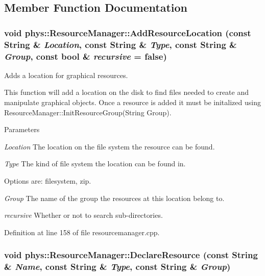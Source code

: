 \subsection{Member Function Documentation}
\hypertarget{classphys_1_1ResourceManager_a0d7d3adce2ad4c70a3e867396e17b090}{
\subsubsection[{AddResourceLocation}]{\setlength{\rightskip}{0pt plus 5cm}void phys::ResourceManager::AddResourceLocation (const {\bf String} \& {\em Location}, \/  const {\bf String} \& {\em Type}, \/  const {\bf String} \& {\em Group}, \/  const bool \& {\em recursive} = {\ttfamily false})}}
\label{d1/d35/classphys_1_1ResourceManager_a0d7d3adce2ad4c70a3e867396e17b090}


Adds a location for graphical resources. 

This function will add a location on the disk to find files needed to create and manipulate graphical objects. Once a resource is added it must be initalized using ResourceManager::InitResourceGroup(String Group). 
\begin{DoxyParams}{Parameters}
\item[{\em Location}]The location on the file system the resource can be found. \item[{\em Type}]The kind of file system the location can be found in. \par
 Options are: filesystem, zip. \item[{\em Group}]The name of the group the resources at this location belong to. \item[{\em recursive}]Whether or not to search sub-\/directories. \end{DoxyParams}


Definition at line 158 of file resourcemanager.cpp.

\hypertarget{classphys_1_1ResourceManager_a6ac7835a02dff32e60a73320f9c9dabb}{
\subsubsection[{DeclareResource}]{\setlength{\rightskip}{0pt plus 5cm}void phys::ResourceManager::DeclareResource (const {\bf String} \& {\em Name}, \/  const {\bf String} \& {\em Type}, \/  const {\bf String} \& {\em Group})}}
\label{d1/d35/classphys_1_1ResourceManager_a6ac7835a02dff32e60a73320f9c9dabb}


